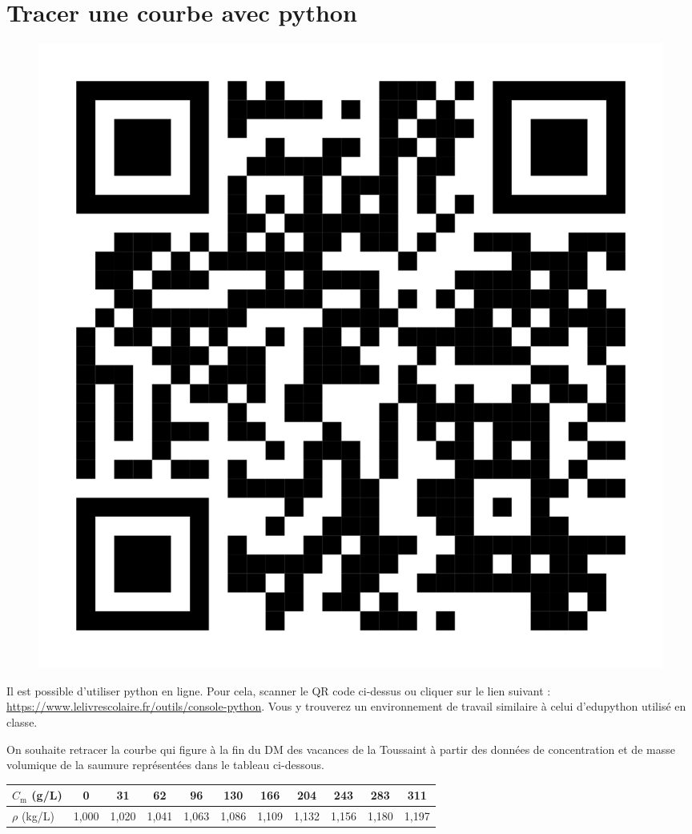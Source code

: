 \documentclass[12pt,a4paper]{article}
\begin{document}
\section*{Tracer une courbe avec python\texttrademark{}}

\begin{figure}[h]
\center
\includegraphics[scale=0.05]{images/qr_console_python.png}
\end{figure}
Il est possible d'utiliser python en ligne.
Pour cela, scanner le QR code ci-dessus ou cliquer sur le lien suivant : \href{https://www.lelivrescolaire.fr/outils/console-python}{https://www.lelivrescolaire.fr/outils/console-python}.
Vous y trouverez un environnement de travail similaire à celui d'edupython utilisé en classe.

On souhaite retracer la courbe qui figure à la fin du DM des vacances de la Toussaint à partir des données de concentration et de masse volumique de la saumure représentées dans le tableau ci-dessous.
\begin{table}[h]
\center
\begin{tabular}{l|c|c|c|c|c|c|c|c|c|c}
$C_\mathrm{m}$ (g/L) & 0 & 31 & 62 & 96 & 130 & 166 & 204 & 243 & 283 & 311 \\
\hline
$\rho$ (kg/L) & 1{,}000&1{,}020&1{,}041&1{,}063&1{,}086&1{,}109&1{,}132&1{,}156&1{,}180&1{,}197 \\
\end{tabular}
\end{table}
\end{document}
